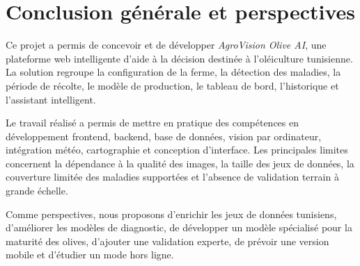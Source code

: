 \documentclass[12pt,a4paper]{report}
\begin{document}
\chapter*{Conclusion générale et perspectives}
Ce projet a permis de concevoir et de développer \textit{AgroVision Olive AI}, une plateforme web intelligente d'aide à la décision destinée à l'oléiculture tunisienne. La solution regroupe la configuration de la ferme, la détection des maladies, la période de récolte, le modèle de production, le tableau de bord, l'historique et l'assistant intelligent.

Le travail réalisé a permis de mettre en pratique des compétences en développement frontend, backend, base de données, vision par ordinateur, intégration météo, cartographie et conception d'interface. Les principales limites concernent la dépendance à la qualité des images, la taille des jeux de données, la couverture limitée des maladies supportées et l'absence de validation terrain à grande échelle.

Comme perspectives, nous proposons d'enrichir les jeux de données tunisiens, d'améliorer les modèles de diagnostic, de développer un modèle spécialisé pour la maturité des olives, d'ajouter une validation experte, de prévoir une version mobile et d'étudier un mode hors ligne.
\end{document}
